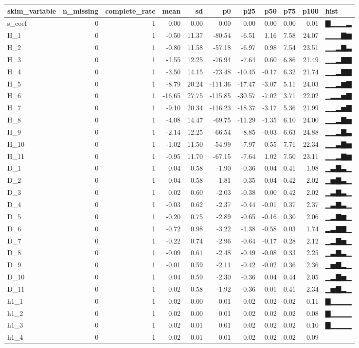 \documentclass[]{article}
\begin{document}
\begin{longtable}[]{@{}lrrrrrrrrrl@{}}
\toprule
skim\_variable & n\_missing & complete\_rate & mean & sd & p0 & p25 &
p50 & p75 & p100 & hist\tabularnewline
\midrule
\endhead
s\_coef & 0 & 1 & 0.00 & 0.00 & 0.00 & 0.00 & 0.00 & 0.00 & 0.01 &
▇▁▁▁▂\tabularnewline
H\_1 & 0 & 1 & -0.50 & 11.37 & -80.54 & -6.51 & 1.16 & 7.58 & 24.07 &
▁▁▁▇▆\tabularnewline
H\_2 & 0 & 1 & -0.80 & 11.58 & -57.18 & -6.97 & 0.98 & 7.54 & 23.51 &
▁▁▂▇▃\tabularnewline
H\_3 & 0 & 1 & -1.55 & 12.25 & -76.94 & -7.64 & 0.60 & 6.86 & 21.49 &
▁▁▂▇▇\tabularnewline
H\_4 & 0 & 1 & -3.50 & 14.15 & -73.48 & -10.45 & -0.17 & 6.32 & 21.74 &
▁▁▂▇▇\tabularnewline
H\_5 & 0 & 1 & -8.79 & 20.24 & -111.36 & -17.47 & -3.07 & 5.11 & 24.03 &
▁▁▂▆▇\tabularnewline
H\_6 & 0 & 1 & -16.65 & 27.75 & -115.85 & -30.57 & -7.02 & 3.71 & 22.02
& ▁▂▂▅▇\tabularnewline
H\_7 & 0 & 1 & -9.10 & 20.34 & -116.23 & -18.37 & -3.17 & 5.36 & 21.99 &
▁▁▂▅▇\tabularnewline
H\_8 & 0 & 1 & -4.08 & 14.47 & -69.75 & -11.29 & -1.35 & 6.10 & 24.00 &
▁▁▂▇▅\tabularnewline
H\_9 & 0 & 1 & -2.14 & 12.25 & -66.54 & -8.85 & -0.03 & 6.63 & 24.88 &
▁▁▂▇▃\tabularnewline
H\_10 & 0 & 1 & -1.02 & 11.50 & -54.99 & -7.97 & 0.55 & 7.71 & 22.34 &
▁▁▃▇▅\tabularnewline
H\_11 & 0 & 1 & -0.95 & 11.70 & -67.15 & -7.64 & 1.02 & 7.50 & 23.11 &
▁▁▂▇▆\tabularnewline
D\_1 & 0 & 1 & 0.04 & 0.58 & -1.90 & -0.36 & 0.04 & 0.41 & 1.98 &
▁▃▇▃▁\tabularnewline
D\_2 & 0 & 1 & 0.04 & 0.58 & -1.81 & -0.35 & 0.04 & 0.42 & 2.02 &
▁▅▇▃▁\tabularnewline
D\_3 & 0 & 1 & 0.02 & 0.60 & -2.03 & -0.38 & 0.00 & 0.42 & 2.02 &
▁▃▇▃▁\tabularnewline
D\_4 & 0 & 1 & -0.03 & 0.62 & -2.37 & -0.44 & -0.01 & 0.37 & 2.37 &
▁▃▇▃▁\tabularnewline
D\_5 & 0 & 1 & -0.20 & 0.75 & -2.89 & -0.65 & -0.16 & 0.30 & 2.06 &
▁▂▇▆▁\tabularnewline
D\_6 & 0 & 1 & -0.72 & 0.98 & -3.22 & -1.38 & -0.58 & 0.03 & 1.74 &
▂▃▇▇▁\tabularnewline
D\_7 & 0 & 1 & -0.22 & 0.74 & -2.96 & -0.64 & -0.17 & 0.28 & 2.12 &
▁▂▇▅▁\tabularnewline
D\_8 & 0 & 1 & -0.09 & 0.61 & -2.48 & -0.49 & -0.08 & 0.33 & 2.25 &
▁▃▇▃▁\tabularnewline
D\_9 & 0 & 1 & -0.01 & 0.59 & -2.11 & -0.42 & -0.02 & 0.36 & 2.36 &
▁▅▇▂▁\tabularnewline
D\_10 & 0 & 1 & 0.04 & 0.59 & -2.30 & -0.36 & 0.04 & 0.44 & 2.05 &
▁▂▇▅▁\tabularnewline
D\_11 & 0 & 1 & 0.02 & 0.58 & -1.92 & -0.36 & 0.01 & 0.41 & 2.34 &
▁▅▇▂▁\tabularnewline
h1\_1 & 0 & 1 & 0.02 & 0.00 & 0.01 & 0.02 & 0.02 & 0.02 & 0.11 &
▇▁▁▁▁\tabularnewline
h1\_2 & 0 & 1 & 0.02 & 0.00 & 0.01 & 0.02 & 0.02 & 0.02 & 0.08 &
▇▁▁▁▁\tabularnewline
h1\_3 & 0 & 1 & 0.02 & 0.01 & 0.01 & 0.02 & 0.02 & 0.02 & 0.10 &
▇▁▁▁▁\tabularnewline
h1\_4 & 0 & 1 & 0.02 & 0.01 & 0.01 & 0.02 & 0.02 & 0.02 & 0.09 &

\end{longtable}
\end{document}
